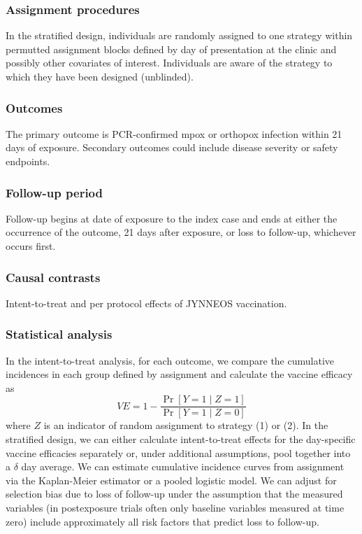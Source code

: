 \documentclass[11pt]{article}
\begin{document}
\subsubsection*{Assignment procedures}
In the stratified design, individuals are randomly assigned to one strategy within permutted assignment blocks defined by day of presentation at the clinic and possibly other covariates of interest. Individuals are aware of the strategy to which they have been designed (unblinded).
 
\subsubsection*{Outcomes}
The primary outcome is PCR-confirmed mpox or orthopox infection within 21 days of exposure. Secondary outcomes could include disease severity or safety endpoints. 

\subsubsection*{Follow-up period}
Follow-up begins at date of exposure to the index case and ends at either the occurrence of the outcome, 21 days after exposure, or loss to follow-up, whichever occurs first.

\subsubsection*{Causal contrasts}
Intent-to-treat and per protocol effects of JYNNEOS vaccination.

\subsubsection*{Statistical analysis}
In the intent-to-treat analysis, for each outcome, we compare the cumulative incidences in each group defined by assignment and calculate the vaccine efficacy as
$$VE = 1 - \frac{\Pr[Y = 1 \mid Z = 1]}{\Pr[Y = 1 \mid Z = 0]}$$
where $Z$ is an indicator of random assignment to strategy (1) or (2). In the stratified design, we can either calculate intent-to-treat effects for the day-specific vaccine efficacies separately or, under additional assumptions, pool together into a $\delta$ day average. We can estimate cumulative incidence curves from assignment via the Kaplan-Meier estimator or a pooled logistic model. We can adjust for selection bias due to loss of follow-up under the assumption that the measured variables (in postexposure trials often only baseline variables measured at time zero) include approximately all risk factors that predict loss to follow-up.
\end{document}
